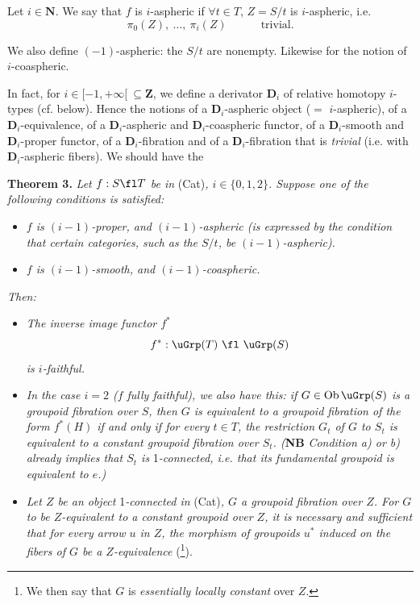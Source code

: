 Let $i \in \mathbf{N}$. We say that $f$ is $i$-aspheric if $\forall t \in T$, $Z = S/t$ is $i$-aspheric, i.e.
\[
\pi_0(Z),\ \dots,\ \pi_i(Z) \qquad\quad \text{trivial.}
\tag*{$(*)$}
\]

We also define $(-1)$-aspheric: the $S/t$ are nonempty. Likewise for the notion of $i$-coaspheric.

In fact, for $i \in [-1,+\infty[ \ \subseteq \mathbf{Z}$, we define a derivator $\mathbf{D}_i$ of relative homotopy $i$-types (cf. below). Hence the notions of a $\mathbf{D}_i$-aspheric object ($=$ $i$-aspheric), of a $\mathbf{D}_i$-equivalence, of a $\mathbf{D}_i$-aspheric and $\mathbf{D}_i$-coaspheric functor, of a $\mathbf{D}_i$-smooth and $\mathbf{D}_i$-proper functor, of a $\mathbf{D}_i$-fibration and of a $\mathbf{D}_i$-fibration that is \textit{trivial} (i.e. with $\mathbf{D}_i$-aspheric fibers). We should have the

\textbf{Theorem 3.} \textit{Let $f : S \fl T$ be in} (Cat)\textit{, $i \in \{0,1,2\}$. Suppose one of the following conditions is satisfied:}

\begin{itemize}[leftmargin=3em]
\item[\textit{a)}] \textit{$f$ is $(i-1)$-proper, and $(i-1)$-aspheric (is expressed by the condition that certain categories, such as the $S/t$, be $(i-1)$-aspheric).}
\item[\textit{b)}] \textit{$f$ is $(i-1)$-smooth, and $(i-1)$-coaspheric.}
\end{itemize}

\textit{Then:}

\begin{itemize}[leftmargin=3em]
\item[\textit{1\textsuperscript{o})}] \textit{The inverse image functor $f^*$}
\[
f^* : \uGrp(T) \ \fl\ \uGrp(S)
\]
\textit{is $i$-faithful.}
\item[\textit{2\textsuperscript{o})}] \textit{In the case $i = 2$ ($f$ fully faithful), we}
\textit{also have this: if $G \in \mathrm{Ob}\,\uGrp(S)$ is a groupoid fibration over $S$, then $G$ is equivalent to a groupoid fibration of the form $f^*(H)$ if and only if for every $t \in T$, the restriction $G_t$ of $G$ to $S_t$ is equivalent to a constant groupoid fibration over $S_t$. (}\textbf{NB} \textit{Condition a) or b) already implies that $S_t$ is} 1\textit{-connected, i.e. that its fundamental groupoid is equivalent to $e$.)}
\item[\textit{3\textsuperscript{o})}] \textit{Let $Z$ be an object} 1\textit{-connected in} (Cat)\textit{, $G$ a groupoid fibration over $Z$. For $G$ to be $Z$-equivalent to a constant groupoid over $Z$, it is necessary and sufficient that for every arrow $u$ in $Z$, the morphism of groupoids $u^*$ induced on the fibers of $G$ be a $Z$-equivalence} (\footnote[3]{We then say that $G$ is \textit{essentially locally constant} over $Z$.}).
\end{itemize}

